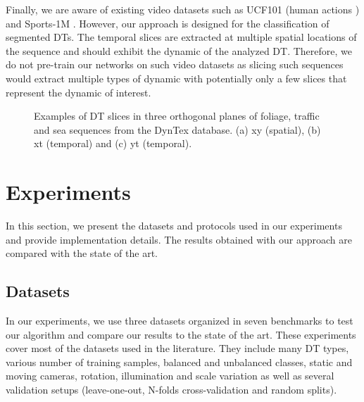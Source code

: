 \documentclass[a4paper,11pt]{article}
\begin{document}
Finally, we are aware of existing video datasets such as UCF101 (human actions \cite{soomro2012ucf101}) and Sports-1M \cite{karpathy2014large}.
However, our approach is designed for the classification of segmented DTs. The temporal slices are extracted at multiple spatial locations of the sequence and should exhibit the dynamic of the analyzed DT.
Therefore, we do not pre-train our networks on such video datasets as slicing such sequences would extract multiple types of dynamic with potentially only a few slices that represent the dynamic of interest.
\begin{figure}[!t]
\centerline{
\hfil
{}
\hfil
{}}
\caption{Examples of DT slices in three orthogonal planes of foliage, traffic and sea sequences from the DynTex database. (a) xy (spatial), (b) xt (temporal) and (c) yt (temporal).}
\label{fig:fig_slices}
\end{figure}

\section{Experiments}
\label{sec:Exp}
In this section, we present the datasets and protocols used in our experiments and provide implementation details.
The results obtained with our approach are compared with the state of the art.

\subsection{Datasets}%
\label{subsec:Datasets}
In our experiments, we use three datasets organized in seven benchmarks to test our algorithm and compare our results to the state of the art.
These experiments cover most of the datasets used in the literature.
They include many DT types, various number of training samples, balanced and unbalanced classes, static and moving cameras, rotation, illumination and scale variation as well as several validation setups (leave-one-out, N-folds cross-validation and random splits).
\end{document}
